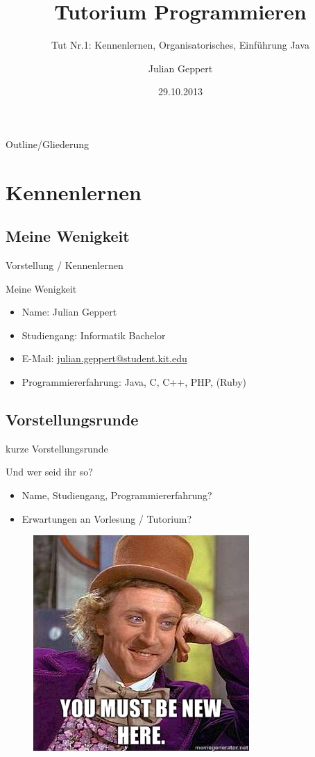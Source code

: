 \documentclass[18pt]{beamer}
\title[Prog Tut Nr. 1]{Tutorium Programmieren}
\subtitle{Tut Nr.1: Kennenlernen, Organisatorisches, Einführung Java}
\author{Julian Geppert}
\date{29.10.2013}
\institute{Institut f\"ur theoretische Informatik}
\begin{document}

\begin{frame}
	\titlepage
\end{frame}

\begin{frame}{Outline/Gliederung}
	\tableofcontents
\end{frame}

\section{Kennenlernen}
\subsection{Meine Wenigkeit}
\begin{frame}{Vorstellung / Kennenlernen}
\begin{block}{Meine Wenigkeit}
	\begin{itemize}
		\item Name: Julian Geppert
		\item Studiengang: Informatik Bachelor
		\item E-Mail: \url{julian.geppert@student.kit.edu}
		\item Programmiererfahrung: Java, C, C++, PHP, (Ruby)
	\end{itemize}
\end{block}
\end{frame}

\subsection{Vorstellungsrunde}
\begin{frame}{kurze Vorstellungsrunde}
\begin{block}{Und wer seid ihr so?}
	\begin{itemize}
		\item Name, Studiengang, Programmiererfahrung?
		\item Erwartungen an Vorlesung / Tutorium?
	\end{itemize}
	\end{block}
	\begin{figure}%
	\center
	\includegraphics[width=0.4\columnwidth]{bild.jpg}%
	\end{figure}
\end{frame}
\end{document}

